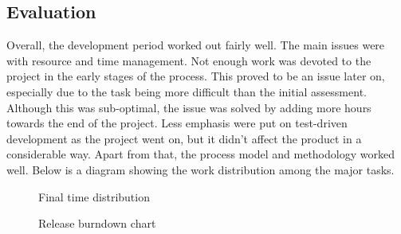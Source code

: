 \subsection{Evaluation}
\label{subsec:project_evaluation-development-evaluation}

Overall, the development period worked out fairly well. The main issues were with resource and time management. Not enough work was devoted to the project in the early stages of the process. This proved to be an issue later on, especially due to the task being more difficult than the initial assessment. Although this was sub-optimal, the issue was solved by adding more hours towards the end of the project. Less emphasis were put on test-driven development as the project went on, but it didn't affect the product in a considerable way. Apart from that, the process model and methodology worked well. Below is a diagram showing the work distribution among the major tasks.

\begin{center}
  \begin{figure}[ht!]
    \caption{Final time distribution}
    \label{fig:kake2}
  \end{figure}
\end{center}

\begin{center}
  \begin{figure}[ht!]
    \caption{Release burndown chart}
    \label{fig:release-burndown}
  \end{figure}
\end{center}

